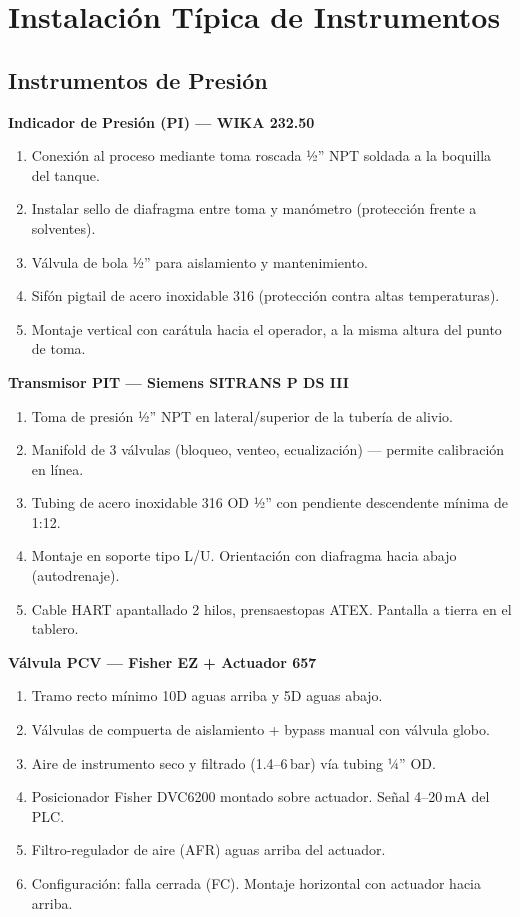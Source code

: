 \documentclass[12pt,letterpaper]{article}
\begin{document}
\section{Instalación Típica de Instrumentos}

\subsection{Instrumentos de Presión}

\textbf{Indicador de Presión (PI) — WIKA 232.50}
\begin{enumerate}[leftmargin=1.5cm, label=\arabic*.]
  \item Conexión al proceso mediante toma roscada ½'' NPT soldada a la boquilla del tanque.
  \item Instalar sello de diafragma entre toma y manómetro (protección frente a solventes).
  \item Válvula de bola ½'' para aislamiento y mantenimiento.
  \item Sifón pigtail de acero inoxidable 316 (protección contra altas temperaturas).
  \item Montaje vertical con carátula hacia el operador, a la misma altura del punto de toma.
\end{enumerate}

\textbf{Transmisor PIT — Siemens SITRANS P DS III}
\begin{enumerate}[leftmargin=1.5cm, label=\arabic*.]
  \item Toma de presión ½'' NPT en lateral/superior de la tubería de alivio.
  \item Manifold de 3 válvulas (bloqueo, venteo, ecualización) — permite calibración en línea.
  \item Tubing de acero inoxidable 316 OD ½'' con pendiente descendente mínima de 1:12.
  \item Montaje en soporte tipo L/U. Orientación con diafragma hacia abajo (autodrenaje).
  \item Cable HART apantallado 2 hilos, prensaestopas ATEX. Pantalla a tierra en el tablero.
\end{enumerate}

\textbf{Válvula PCV — Fisher EZ + Actuador 657}
\begin{enumerate}[leftmargin=1.5cm, label=\arabic*.]
  \item Tramo recto mínimo 10D aguas arriba y 5D aguas abajo.
  \item Válvulas de compuerta de aislamiento + bypass manual con válvula globo.
  \item Aire de instrumento seco y filtrado (1.4--6\,bar) vía tubing ¼'' OD.
  \item Posicionador Fisher DVC6200 montado sobre actuador. Señal 4--20\,mA del PLC.
  \item Filtro-regulador de aire (AFR) aguas arriba del actuador.
  \item Configuración: falla cerrada (FC). Montaje horizontal con actuador hacia arriba.
\end{enumerate}
\end{document}
